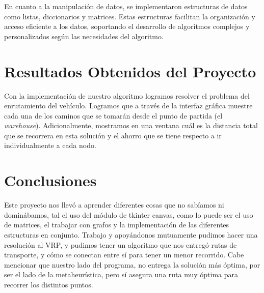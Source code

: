 \documentclass[10pt,twocolumn,letterpaper]{article}
\begin{document}
En cuanto a la manipulación de datos, se implementaron estructuras de datos como listas, diccionarios y matrices. Estas estructuras facilitan la organización y acceso eficiente a los datos, soportando el desarrollo de algoritmos complejos y personalizados según las necesidades del algoritmo.

\section{Resultados Obtenidos del Proyecto}
Con la implementación de nuestro algoritmo logramos resolver el problema del enrutamiento del vehículo. Logramos que a través de la interfaz gráfica muestre cada una de los caminos que se tomarán desde el punto de partida (el \textit{warehouse}). Adicionalmente, mostramos en una ventana cuál es la distancia total que se recorrera en esta solución y el ahorro que se tiene respecto a ir individualmente a cada nodo.

\section{Conclusiones}
Este proyecto nos llevó a aprender diferentes cosas que no sabíamos ni dominábamos, tal el uso del módulo de tkinter canvas, como lo puede ser el uso de matrices, el trabajar con grafos y la implementación de las diferentes estructuras en conjunto. Trabajo y apoyándonos mutuamente pudimos hacer una resolución al VRP, y pudimos tener un algoritmo que nos entregó rutas de transporte, y cómo se conectan entre sí para tener un menor recorrido. Cabe mencionar que nuestro lado del programa, no entrega la solución más óptima, por ser el lado de la metaheurística, pero sí asegura una ruta muy óptima para recorrer los distintos puntos.


\nocite{*} %

\clearpage


\end{document}
